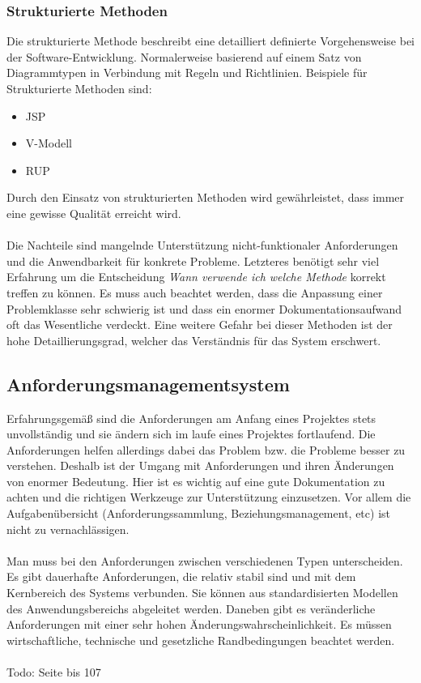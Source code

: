 \subsubsection{Strukturierte Methoden}
Die strukturierte Methode beschreibt eine detailliert definierte Vorgehensweise bei der Software-Entwicklung. Normalerweise basierend auf einem Satz von Diagrammtypen in Verbindung mit Regeln und Richtlinien. Beispiele für Strukturierte Methoden sind:
\begin{itemize}
\item JSP
\item V-Modell
\item RUP
\end{itemize}

Durch den Einsatz von strukturierten Methoden wird gewährleistet, dass immer eine gewisse Qualität erreicht wird. 
\\\\
Die Nachteile sind mangelnde Unterstützung nicht-funktionaler Anforderungen und die Anwendbarkeit für konkrete Probleme. Letzteres benötigt sehr viel Erfahrung um die Entscheidung \textit{Wann verwende ich welche Methode} korrekt treffen zu können. Es muss auch beachtet werden, dass die Anpassung einer Problemklasse sehr schwierig ist und dass ein enormer Dokumentationsaufwand oft das Wesentliche verdeckt. Eine weitere Gefahr bei dieser Methoden ist der hohe  Detaillierungsgrad, welcher das Verständnis für das System erschwert.

\subsection{Anforderungsmanagementsystem}
Erfahrungsgemäß sind die Anforderungen am Anfang eines Projektes stets unvollständig und sie ändern sich im laufe eines Projektes fortlaufend. Die Anforderungen helfen allerdings dabei das Problem bzw. die Probleme besser zu verstehen. Deshalb ist der Umgang mit Anforderungen und ihren Änderungen von enormer Bedeutung.  Hier ist es wichtig auf eine gute Dokumentation zu achten und die richtigen Werkzeuge zur Unterstützung einzusetzen. Vor allem die Aufgabenübersicht (Anforderungssammlung, Beziehungsmanagement, etc) ist nicht zu vernachlässigen.
\\\\
Man muss bei den Anforderungen zwischen verschiedenen Typen unterscheiden. Es gibt dauerhafte Anforderungen, die relativ stabil sind und mit dem Kernbereich des Systems verbunden. Sie können aus standardisierten Modellen des Anwendungsbereichs abgeleitet werden. Daneben gibt es veränderliche Anforderungen mit einer sehr hohen Änderungswahrscheinlichkeit. Es müssen wirtschaftliche, technische und gesetzliche Randbedingungen beachtet werden. 
\\\\
Todo: Seite bis 107